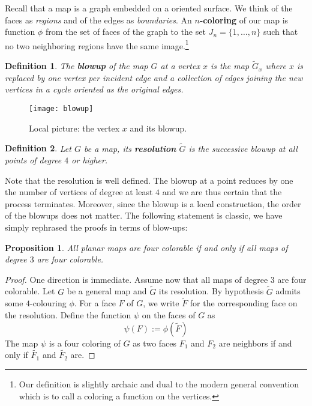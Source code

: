 \documentclass[11pt]{amsart}
\newtheorem{prop}{Proposition}[section]
\newtheorem{defi}{Definition}[section]
\begin{document}
Recall that  a {map} is a graph embedded on a oriented surface. 
We think of the faces as \emph{regions} and of the edges as \emph{boundaries}.
An {\bf $n$-coloring} of our map is function $\phi$ from the set of faces of the graph to the set $J_{n}=\{1,\ldots,n\}$ such that no two neighboring regions have the same image.\footnote{Our definition is slightly archaic and dual to the modern general convention which is to call a coloring a function on the vertices.}

\begin{defi}
The {\bf blowup} of the map $G$ at a vertex $x$ is the map $\tilde{G}_x$ where $x$ is replaced by one vertex per incident edge and a collection of edges joining the new vertices in a cycle oriented as the original edges.
\end{defi}

\begin{figure}[!ht]
{\texttt{[image: blowup]}}
\caption{Local picture: the vertex $x$ and its blowup.}
\label{fig:blowup}
\end{figure}

\begin{defi}
Let $G$ be a map, its {\bf resolution} $\tilde{G}$ is the successive blowup at all points of degree $4$ or higher. 
\end{defi}

Note that the resolution is well defined.
The blowup at a point reduces by one the number of vertices of degree at least $4$ and we are thus certain that the process terminates.
Moreover, since the blowup is a local construction, the order of the blowups does not matter. 
The following statement is classic, we have simply rephrased the proofs in terms of blow-ups:

\begin{prop}
All planar maps are four colorable if and only if all maps of degree $3$ are four colorable.
\end{prop}

\begin{proof}
One direction is immediate.
Assume now that all maps of degree $3$ are four colorable.
Let $G$ be a general map and $\tilde{G}$ its resolution.
By hypothesis $\tilde{G}$ admits some $4$-colouring $\phi$.
For a face $F$ of $G$, we write $\tilde{F}$ for the corresponding face on the resolution.
Define the function $\psi$ on the faces of $G$ as 
$$\psi(F):=\phi(\tilde{F})$$
The map $\psi$ is a four coloring of $G$ as two faces  $F_1$ and $F_2$ are neighbors if and only if $\tilde{F_1}$ and $\tilde{F_2}$ are.
\end{proof}
\end{document}
